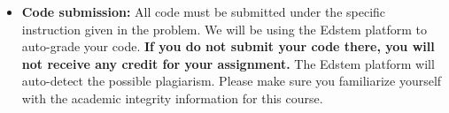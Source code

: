 \begin{itemize}
\begin{itemize}
\item \textbf{Code submission:} All code must be submitted under the specific instruction given in the problem. We will be using the Edstem platform to auto-grade your code. \textbf{If you do not submit your code there, you will not receive any credit for your assignment.} The Edstem platform will auto-detect the possible plagiarism. Please make sure you familiarize yourself with the academic integrity information for this course.

\end{itemize}


\end{itemize}